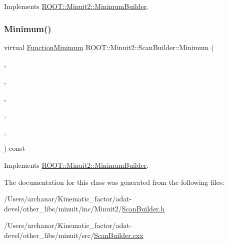 Implements \mbox{\hyperlink{classROOT_1_1Minuit2_1_1MinimumBuilder_aefaa624436afa8195af1f3393a35981f}{R\+O\+O\+T\+::\+Minuit2\+::\+Minimum\+Builder}}.

\mbox{\label{classROOT_1_1Minuit2_1_1ScanBuilder_a24547691823b9f0977e6b23b6d084e7a}} 
\subsubsection{\texorpdfstring{Minimum()}{Minimum()}\hspace{0.1cm}{\footnotesize\ttfamily [3/3]}}
{\footnotesize\ttfamily virtual \mbox{\hyperlink{classROOT_1_1Minuit2_1_1FunctionMinimum}{Function\+Minimum}} R\+O\+O\+T\+::\+Minuit2\+::\+Scan\+Builder\+::\+Minimum (\begin{DoxyParamCaption}\item[{const \mbox{\hyperlink{classROOT_1_1Minuit2_1_1MnFcn}{Mn\+Fcn}} \&}]{,  }\item[{const \mbox{\hyperlink{classROOT_1_1Minuit2_1_1GradientCalculator}{Gradient\+Calculator}} \&}]{,  }\item[{const \mbox{\hyperlink{classROOT_1_1Minuit2_1_1MinimumSeed}{Minimum\+Seed}} \&}]{,  }\item[{const \mbox{\hyperlink{classROOT_1_1Minuit2_1_1MnStrategy}{Mn\+Strategy}} \&}]{,  }\item[{unsigned int}]{,  }\item[{double}]{ }\end{DoxyParamCaption}) const\hspace{0.3cm}{\ttfamily [virtual]}}



Implements \mbox{\hyperlink{classROOT_1_1Minuit2_1_1MinimumBuilder_aefaa624436afa8195af1f3393a35981f}{R\+O\+O\+T\+::\+Minuit2\+::\+Minimum\+Builder}}.



The documentation for this class was generated from the following files\+:\begin{DoxyCompactItemize}
\item 
/\+Users/archanar/\+Kinematic\+\_\+factor/adat-\/devel/other\+\_\+libs/minuit/inc/\+Minuit2/\mbox{\hyperlink{adat-devel_2other__libs_2minuit_2inc_2Minuit2_2ScanBuilder_8h}{Scan\+Builder.\+h}}\item 
/\+Users/archanar/\+Kinematic\+\_\+factor/adat-\/devel/other\+\_\+libs/minuit/src/\mbox{\hyperlink{adat-devel_2other__libs_2minuit_2src_2ScanBuilder_8cxx}{Scan\+Builder.\+cxx}}\end{DoxyCompactItemize}
